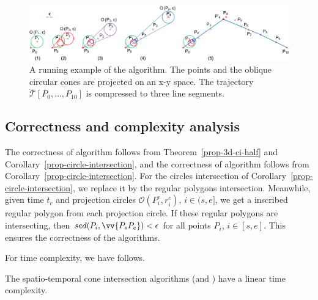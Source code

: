 \begin{figure}[tb!]
\centering
\includegraphics[scale=0.8]{figures/Fig-conesta.png}
\vspace{-1ex}
\caption{\small A running example of the \cista algorithm. The points and the oblique circular cones are projected on an x-y space. The trajectory $\dddot{\mathcal{T}}[P_0, \ldots, P_{10}]$ is compressed to three line segments.}
\vspace{-2ex}
\label{fig:exm-consta}
\end{figure}



\subsection{Correctness and complexity analysis}

The correctness of algorithm \cist follows from Theorem~\ref{prop-3d-ci-half} and Corollary~\ref{prop-circle-intersection}, and the correctness of algorithm \cista follows from Corollary~\ref{prop-circle-intersection}. For the circles intersection of Corollary~\ref{prop-circle-intersection}, we replace it by the regular polygons intersection.
Meanwhile, given time $t_c$ and projection circles $\mathcal{O}(P^c_i, r^c_i)$, $i \in (s, e]$, we get a inscribed regular polygon from each projection circle.
If these regular polygons are intersecting, then $sed(P_i, \vv{P_sP_e})<\epsilon$ for all points $P_i$, $i \in [s,e]$.
This ensures the correctness of the algorithms.


For time complexity, we have follows.





\begin{theorem}
\label{prop-cist-complexity}
The spatio-temporal cone intersection algorithms (\cist and \cista) have a linear time complexity.
\end{theorem}

